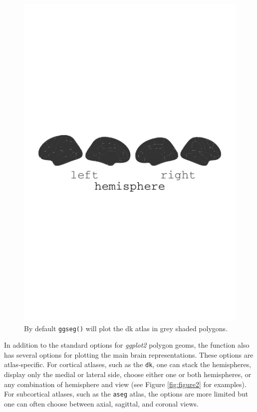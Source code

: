 \documentclass[fleqn,10pt]{wlpeerj} %
\begin{document}
\begin{figure}
\centering
\includegraphics{msc_ggseg_files/figure-latex/figure1-1.pdf}
\caption{\label{fig:figure1}By default \texttt{ggseg()} will plot the dk atlas in grey shaded polygons.}
\end{figure}

In addition to the standard options for \emph{ggplot2} polygon geoms, the function also has several options for plotting the main brain representations.
These options are atlas-specific.
For cortical atlases, such as the \texttt{dk}, one can stack the hemispheres, display only the medial or lateral side, choose either one or both hemispheres, or any combination of hemisphere and view (see Figure \ref{fig:figure2} for examples).
For subcortical atlases, such as the \texttt{aseg} atlas, the options are more limited but one can often choose between axial, sagittal, and coronal views.
\end{document}
